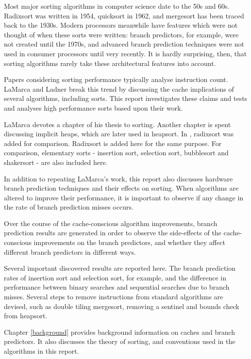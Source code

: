 \label{intro}
Most major sorting algorithms in computer science date to the 50s and 60s.
Radixsort was written in 1954, quicksort in 1962, and mergesort has been traced
back to the 1930s. Modern processors meanwhile have features which were not
thought of when these sorts were written: branch predictors, for example, were
not created until the 1970s, and advanced branch prediction techniques were
not used in consumer processors until very recently. It is hardly surprising,
then, that sorting algorithms rarely take these architectural features into
account.

Papers considering sorting performance typically analyse instruction count.
LaMarca and Ladner \cite{LaMarca96} break this trend by discussing the cache
implications of several algorithms, including sorts. This report 
investigates these claims and tests and analyses high performance sorts
based upon their work.

LaMarca devotes a chapter of his thesis to sorting. Another chapter is spent
discussing implicit heaps, which are later used in heapsort. In
\cite{LaMarca99}, radixsort was added for comparison. Radixsort is added here
for the same purpose. For comparison, elementary sorts - insertion sort,
selection sort, bubblesort and shakersort - are also included here.

In addition to repeating LaMarca's work, this report also discusses hardware
branch prediction techniques and their effects on sorting. When algorithms are
altered to improve their performance, it is important to observe if any change
in the rate of branch prediction misses occurs.

Over the course of the cache-conscious algorithm improvements, branch prediction
results are generated in order to observe the side-effects of the
cache-conscious improvements on the branch predictors, and whether they affect
different branch predictors in different ways. 

Several important discovered results are reported here. The
branch prediction rates of insertion sort and selection sort, for example, and
the difference in performance between binary searches and sequential searches due
to branch misses. Several steps to remove instructions from standard algorithms
are devised, such as double tiling mergesort, removing a sentinel and bounds
check from heapsort.

Chapter \ref{background} provides background information on caches and branch predictors. It
also discusses the theory of sorting, and conventions used in the algorithms in
this report.

